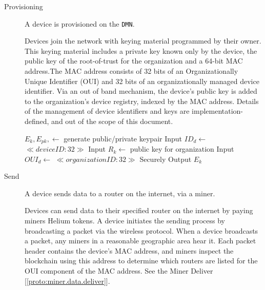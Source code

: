 \documentclass[10pt, nonatbib, nocopyrightspace, reprint]{sigplanconf}
\newenvironment{protocol}[2]{
  \begin{algorithm}[!htb]
    \DontPrintSemicolon
    \caption{#1}\label{#2}
}{
  \end{algorithm}
  \FloatBarrier
}
\newcommand{\protoref}[1]{[\autoref{#1}]}
\begin{document}
\begin{description}
  \item [Provisioning] A device is provisioned on the \verb|DMN|.

    Devices join the network with keying material programmed by their owner. This keying material includes a private key known only by the device, the public key of the root-of-trust for the organization and a 64-bit MAC address.The MAC address consists of 32 bits of an Organizationally Unique Identifier (OUI) and 32 bits of an organizationally managed device identifier. Via an out of band mechanism, the device's public key is added to the organization's device registry, indexed by the MAC address. Details of the management of device identifiers and keys are implementation-defined, and out of the scope of this document.

    \begin{protocol}{Device Provisioning}{proto:device.provision}

       {
        $E_k, E_{pk}, \leftarrow $ generate public/private keypair \;
        Input ${ID}_d \leftarrow $ $ \ll device ID:32 \gg $ \;
        Input $R_k \leftarrow $ public key for organization \;
        Input ${OUI}_d \leftarrow $ $ \ll organization ID:32 \gg $ \;
        \BlankLine
        Securely  \;
        \BlankLine
        Output $E_k$ \;
      }
    \end{protocol}


  \item [Send] A device sends data to a router on the internet, via a miner.

    Devices can send data to their specified router on the internet by paying miners Helium tokens.
    A device initiates the sending process by broadcasting a packet via the wireless protocol. When a device broadcasts a packet, any miners in a reasonable geographic area hear it. Each packet header contains the device's MAC address, and miners inspect the blockchain using this address to determine which routers are listed for the OUI component of the MAC address. See the Miner Deliver \protoref{proto:miner.data.deliver}.

    \begin{protocol}{Device Send Data}{proto:device.data.send}


\end{protocol}
\end{description}
\end{document}
